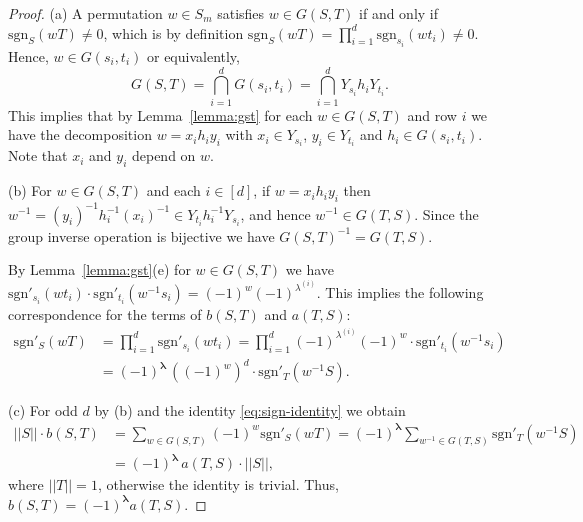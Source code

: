\documentclass[12pt, reqno]{amsart}
\theoremstyle{definition}
\newcommand{\sgn}{\mathrm{sgn}}
\begin{document}
\begin{proof} 
	(a) A permutation $w \in S_m$ satisfies $w \in G(S,T)$ if and only if $\sgn_S(wT) \neq 0$, which is by definition $\sgn_S(wT) = \prod_{i=1}^d\sgn_{s_i}(wt_i) \neq 0$. Hence, $w \in G(s_i, t_i)$ or equivalently, 
	$$
		G(S,T) = \bigcap_{i=1}^d G(s_i, t_i) = \bigcap_{i=1}^d Y_{s_i}h_iY_{t_i}.
	$$
	This implies that  by Lemma~\ref{lemma:gst} for each $w \in G(S,T)$ and row $i$ we have the decomposition $w = x_i h_i y_i$ with $x_i \in Y_{s_i}$, $y_i \in Y_{t_i}$ and $h_i \in G(s_i,t_i)$. Note that $x_i$ and $y_i$ depend on $w$. %

    \vspace{0.5em}

	(b) For $w \in G(S,T)$ and each $i \in [d]$, if $w = x_i h_i y_i$ then $w^{-1} = (y_i)^{-1} h^{-1}_i (x_i)^{-1} \in Y_{t_i} h^{-1}_i Y_{s_i}$, and hence $w^{-1} \in G(T,S)$. Since the group inverse operation is bijective we have $G(S,T)^{-1} = G(T,S)$. %

    By Lemma~\ref{lemma:gst}(e) for $w \in G(S,T)$ we have $\sgn'_{s_i}(w t_i) \cdot \sgn'_{t_i}(w^{-1} s_i) = (-1)^{w}(-1)^{\lambda^{(i)}}$. This implies the following correspondence for the terms of $b(S,T)$ and $a(T,S)$:
    \begin{align}\label{eq:sign-identity}
        \sgn'_S(wT) 
        &= \prod_{i=1}^d \sgn'_{s_i}(w t_i) \nonumber 
        = \prod_{i=1}^d (-1)^{\lambda^{(i)}} (-1)^{w}\cdot \sgn'_{t_i}(w^{-1} s_i) \nonumber 
        \\
        &= (-1)^{\pmb{\lambda}}\, ((-1)^{w})^d \cdot \sgn'_T(w^{-1}S). 
    \end{align}

	(c) For odd $d$ by (b) and the identity \eqref{eq:sign-identity} we obtain
	\begin{align*}
		||S|| \cdot b(S,T) &= \sum_{w \in G(S,T)}(-1)^w\sgn'_S(wT)
		= (-1)^{\pmb{\lambda}}\sum_{w^{-1} \in G(T,S)} \sgn'_T(w^{-1}S) \\
		&= (-1)^{\pmb{\lambda}}\, a(T,S) \cdot ||S||,
	\end{align*}
    where $||T|| = 1$, otherwise the identity is trivial. Thus, $b(S,T) = (-1)^{\pmb{\lambda}} a(T,S)$.


\end{proof}
\end{document}
